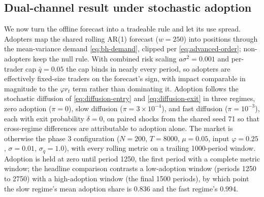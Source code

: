 \documentclass[12pt]{article}
\begin{document}
\subsection{Dual-channel result under stochastic adoption}\label{sec:phase4-results}

We now turn the offline forecast into a tradeable rule and let its use spread. Adopters map the shared rolling AR(1) forecast ($w=250$) into positions through the mean-variance demand \eqref{eq:bh-demand}, clipped per \eqref{eq:advanced-order}; non-adopters keep the null rule. %
With combined risk scaling $a\sigma^{2}=0.001$ and per-trader cap $\bar{q}=0.05$ the cap binds in nearly every period, so adopters are effectively fixed-size traders on the forecast's sign, with impact comparable in magnitude to the $\varphi r_t$ term rather than dominating it. %
Adoption follows the stochastic diffusion of \eqref{eq:diffusion-entry} and \eqref{eq:diffusion-exit} in three regimes, zero adoption ($\pi=0$), slow diffusion ($\pi=3\times10^{-4}$), and fast diffusion ($\pi=10^{-3}$), each with exit probability $\delta=0$, on paired shocks from the shared seed 71 so that cross-regime differences are attributable to adoption alone. %
The market is otherwise the phase 3 configuration ($N=200$, $T=8000$, $\mu=0.05$, input $\varphi=0.25$, $\sigma=0.01$, $\sigma_q=1.0$), with every rolling metric on a trailing 1000-period window. %
Adoption is held at zero until period 1250, the first period with a complete metric window; the headline comparison contrasts a low-adoption window (periods 1250 to 2750) with a high-adoption window (the final 1500 periods), by which point the slow regime's mean adoption share is 0.836 and the fast regime's 0.994. %
\end{document}
